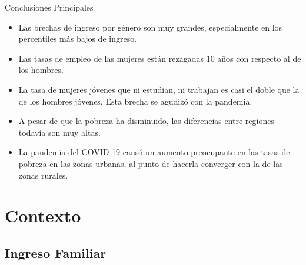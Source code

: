 \documentclass[aspectratio=169]{beamer}
\begin{document}
    
    
    \begin{frame}{Conclusiones Principales}
    
    \begin{itemize}
        \item Las brechas de ingreso por género son muy grandes, especialmente en los percentiles más bajos de ingreso.
        \item Las tasas de empleo de las mujeres están rezagadas 10 años con respecto al de los hombres.
        \item La tasa de mujeres jóvenes que ni estudian, ni trabajan es casi el doble que la de los hombres jóvenes. Esta brecha se agudizó con la pandemia.
        \item A pesar de que la pobreza ha disminuido, las diferencias entre regiones todavía son muy altas.
        \item La pandemia del COVID-19 causó un aumento preocupante en las tasas de pobreza en las zonas urbanas, al punto de hacerla converger con la de las zonas  rurales.
    \end{itemize}

    
    \end{frame}
    
    \section{Contexto}
        
    \subsection{Ingreso Familiar}
    
\end{document}

